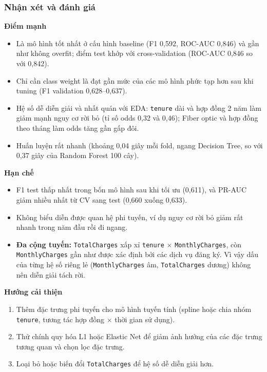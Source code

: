 \subsubsection{Nhận xét và đánh giá}
\textbf{Điểm mạnh}
\begin{itemize}
    \item Là mô hình tốt nhất ở cấu hình baseline (F1 0,592, ROC-AUC 0,846) và gần như không overfit; điểm test khớp với cross-validation (ROC-AUC 0,846 so với 0,842).
    \item Chỉ cần class weight là đạt gần mức của các mô hình phức tạp hơn sau khi tuning (F1 validation 0,628--0,637).
    \item Hệ số dễ diễn giải và nhất quán với EDA: \texttt{tenure} dài và hợp đồng 2 năm làm giảm mạnh nguy cơ rời bỏ (tỉ số odds 0,32 và 0,46); Fiber optic và hợp đồng theo tháng làm odds tăng gần gấp đôi.
    \item Huấn luyện rất nhanh (khoảng 0,04 giây mỗi fold, ngang Decision Tree, so với 0,37 giây của Random Forest 100 cây).
\end{itemize}

\textbf{Hạn chế}
\begin{itemize}
    \item F1 test thấp nhất trong bốn mô hình sau khi tối ưu (0,611), và PR-AUC giảm nhiều nhất từ CV sang test (0,660 xuống 0,633).
    \item Không biểu diễn được quan hệ phi tuyến, ví dụ nguy cơ rời bỏ giảm rất nhanh trong năm đầu rồi đi ngang.
    \item \textbf{Đa cộng tuyến:} \texttt{TotalCharges} xấp xỉ \texttt{tenure} $\times$ \texttt{MonthlyCharges}, còn \texttt{MonthlyCharges} gần như được xác định bởi các dịch vụ đăng ký. Vì vậy dấu của từng hệ số riêng lẻ (\texttt{MonthlyCharges} âm, \texttt{TotalCharges} dương) không nên diễn giải tách rời.
\end{itemize}

\textbf{Hướng cải thiện}
\begin{enumerate}
    \item Thêm đặc trưng phi tuyến cho mô hình tuyến tính (spline hoặc chia nhóm \texttt{tenure}, tương tác hợp đồng $\times$ thời gian sử dụng).
    \item Thử chính quy hóa L1 hoặc Elastic Net để giảm ảnh hưởng của các đặc trưng tương quan và chọn lọc đặc trưng.
    \item Loại bỏ hoặc biến đổi \texttt{TotalCharges} để hệ số dễ diễn giải hơn.
\end{enumerate}
